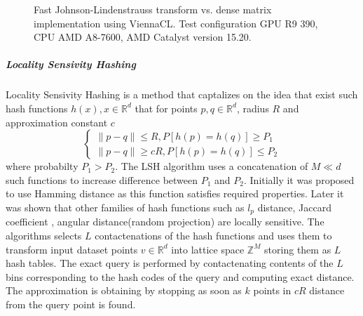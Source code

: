  \begin{figure}[h]
 \centering

 \caption{\label{Fast Johnson-Lindenstrauss transform} Fast
 Johnson-Lindenstrauss transform vs. dense matrix implementation using ViennaCL.
 Test configuration GPU R9 390, CPU AMD A8-7600, AMD Catalyst version 15.20.}
\end{figure}

 

\subparagraph*{Locality Sensivity Hashing}
Locality Sensivity Hashing\cite{Indyk:1998:ANN:276698.276876} is a method that
captalizes on the idea that exist such hash functions $ h(x), x \in
\mathbb{R}^d $ that for  points $p,q \in \mathbb{R}^d $, radius $ R $ and
approximation constant $ c $
\[
\left \{ 
\begin{array}{ll} 
  \|p-q\| \leq R,  P[h(p) = h(q)] \geq P_1  \\
  \|p-q\| \geq cR, P[h(p) = h(q)] \leq P_2   
 \end{array}
 \right.
\]
where probabilty $ P_1 > P_2 $.
The LSH algorithm uses a concatenation of $ M \ll d $ such functions to increase
difference between $P_1$ and $P_2$\cite{Indyk:1998:ANN:276698.276876}. Initially
it was proposed to use Hamming distance as this function satisfies required
properties\cite{Indyk:1998:ANN:276698.276876}. Later it was shown that other
families of hash functions such as $ l_p $
distance\cite{Datar:2004:LHS:997817.997857}, Jaccard coefficient
\cite{Broder:1997:SCW:283554.283370}\cite{Broder:1997:SCW:283202.283370},
angular distance(random projection)\cite{Charikar:2002:SET:509907.509965} are
locally sensitive.
The algorithms selects $ L $ contactenations of the hash functions and uses them
to  transform input dataset points $ v \in \mathbb{R}^d $ into lattice space $
\mathbb{Z}^M$ storing them as $ L $ hash tables. 
The exact query is performed by contactenating contents of the $ L $ bins
corresponding to the hash codes of the query and computing exact distance. The
approximation is obtaining by stopping as soon as $ k $ points in $ cR $
distance from the query point is found. 


